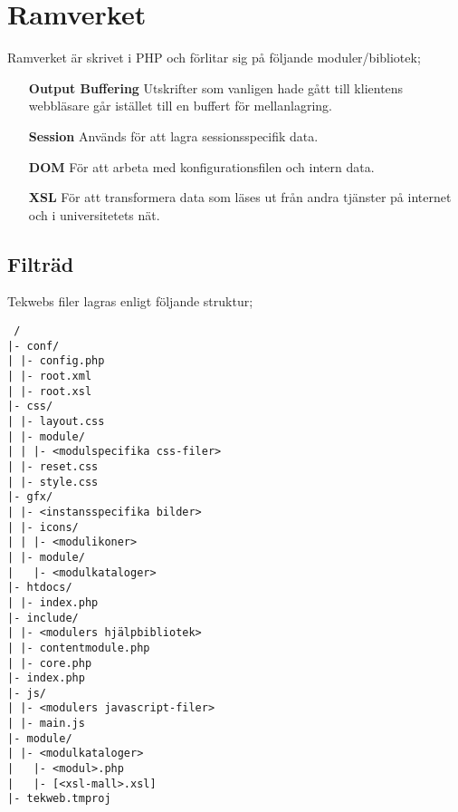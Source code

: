 \section{Ramverket}
Ramverket är skrivet i PHP och förlitar sig på följande
moduler/bibliotek;

\begin{itemize}
  \item[{\bf Output Buffering}] Utskrifter som vanligen hade gått till
    klientens webbläsare går istället till en buffert för mellanlagring.

  \item[{\bf Session}] Används för att lagra sessionsspecifik data.

  \item[{\bf DOM}] För att arbeta med konfigurationsfilen och intern data.

  \item[{\bf XSL}] För att transformera data som läses ut från andra tjänster
    på internet och i universitetets nät.
\end{itemize}

\subsection{Filträd}
Tekwebs filer lagras enligt följande struktur;

\begin{verbatim}
 /
|- conf/
| |- config.php
| |- root.xml
| |- root.xsl
|- css/
| |- layout.css
| |- module/
| | |- <modulspecifika css-filer>
| |- reset.css
| |- style.css
|- gfx/
| |- <instansspecifika bilder>
| |- icons/
| | |- <modulikoner>
| |- module/
|   |- <modulkataloger>
|- htdocs/
| |- index.php
|- include/
| |- <modulers hjälpbibliotek>
| |- contentmodule.php
| |- core.php
|- index.php
|- js/
| |- <modulers javascript-filer> 
| |- main.js
|- module/
| |- <modulkataloger>
|   |- <modul>.php
|   |- [<xsl-mall>.xsl]
|- tekweb.tmproj
\end{verbatim}
